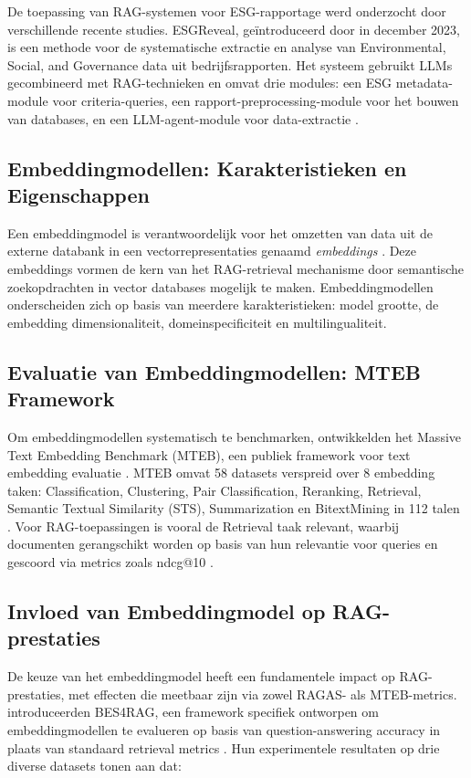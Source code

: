 De toepassing van RAG-systemen voor ESG-rapportage werd onderzocht door verschillende recente studies. ESGReveal, geïntroduceerd door \textcite{Zou2023} in december 2023, is een methode voor de systematische extractie en analyse van Environmental, Social, and Governance data uit bedrijfsrapporten. Het systeem gebruikt LLMs gecombineerd met RAG-technieken en omvat drie modules: een ESG metadata-module voor criteria-queries, een rapport-preprocessing-module voor het bouwen van databases, en een LLM-agent-module voor data-extractie \autocite{Zou2023}.

\subsection{Embeddingmodellen: Karakteristieken en Eigenschappen}

Een embeddingmodel is verantwoordelijk voor het omzetten van data uit de externe databank in een vectorrepresentaties genaamd \textit{embeddings} \autocite{Khanna2025}. Deze embeddings vormen de kern van het RAG-retrieval mechanisme door semantische zoekopdrachten in vector databases mogelijk te maken. Embeddingmodellen onderscheiden zich op basis van meerdere karakteristieken: model grootte, de embedding dimensionaliteit, domeinspecificiteit en multilingualiteit.

\subsection{Evaluatie van Embeddingmodellen: MTEB Framework}

Om embeddingmodellen systematisch te benchmarken, ontwikkelden \textcite{Muennighoff2022} het Massive Text Embedding Benchmark (MTEB), een publiek framework voor text embedding evaluatie \autocite{Muennighoff2022}. MTEB omvat 58 datasets verspreid over 8 embedding taken: Classification, Clustering, Pair Classification, Reranking, Retrieval, Semantic Textual Similarity (STS), Summarization en BitextMining in 112 talen \autocite{Muennighoff2022}. Voor RAG-toepassingen is vooral de Retrieval taak relevant, waarbij documenten gerangschikt worden op basis van hun relevantie voor queries en gescoord via metrics zoals \gls{ndcg@10} \autocite{Muennighoff2022}.

\subsection{Invloed van Embeddingmodel op RAG-prestaties}

De keuze van het embeddingmodel heeft een fundamentele impact op RAG-prestaties, met effecten die meetbaar zijn via zowel RAGAS- als MTEB-metrics. \textcite{Canale2025} introduceerden BES4RAG, een framework specifiek ontworpen om embeddingmodellen te evalueren op basis van question-answering accuracy in plaats van standaard retrieval metrics \autocite{Canale2025}. Hun experimentele resultaten op drie diverse datasets tonen aan dat:

